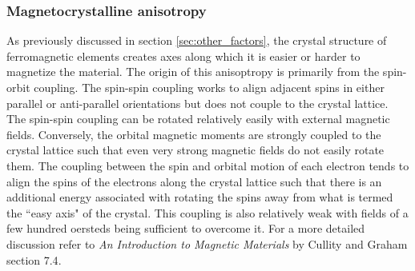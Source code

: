 \documentclass[preprint,12pt]{elsarticle}
\begin{document}
\subsubsection{Magnetocrystalline anisotropy}
As previously discussed in section \ref{sec:other_factors}, the crystal structure of ferromagnetic elements  creates axes along which it is easier or harder to magnetize the material. The origin of this anisoptropy is primarily from the spin-orbit coupling. The spin-spin coupling works to align adjacent spins in either parallel or anti-parallel orientations but does not couple to the crystal lattice. The spin-spin coupling can be rotated relatively easily with external magnetic fields. Conversely, the orbital magnetic moments are strongly coupled to the crystal lattice such that even very strong magnetic fields do not easily rotate them. The coupling between the spin and orbital motion of each electron tends to align the spins of the electrons along the crystal lattice such that there is an additional energy associated with rotating the spins away from what is termed the ``easy axis" of the crystal. This coupling is also relatively weak with fields of a few hundred oersteds being sufficient to overcome it. For a more detailed discussion refer to {\it An Introduction to Magnetic Materials} by Cullity and Graham section 7.4\cite{Cullity2008}.





\end{document}
